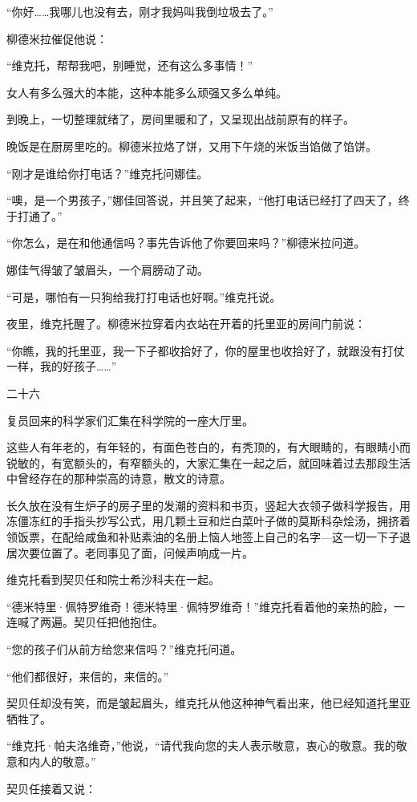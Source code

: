“你好……我哪儿也没有去，刚才我妈叫我倒垃圾去了。”

柳德米拉催促他说：

“维克托，帮帮我吧，别睡觉，还有这么多事情！”

女人有多么强大的本能，这种本能多么顽强又多么单纯。

到晚上，一切整理就绪了，房间里暖和了，又呈现出战前原有的样子。

晚饭是在厨房里吃的。柳德米拉烙了饼，又用下午烧的米饭当馅做了馅饼。

“刚才是谁给你打电话？”维克托问娜佳。

“噢，是一个男孩子，”娜佳回答说，并且笑了起来，“他打电话已经打了四天了，终于打通了。”

“你怎么，是在和他通信吗？事先告诉他了你要回来吗？”柳德米拉问道。

娜佳气得皱了皱眉头，一个肩膀动了动。

“可是，哪怕有一只狗给我打打电话也好啊。”维克托说。

夜里，维克托醒了。柳德米拉穿着内衣站在开着的托里亚的房间门前说：

“你瞧，我的托里亚，我一下子都收拾好了，你的屋里也收拾好了，就跟没有打仗一样，我的好孩子……”

二十六

复员回来的科学家们汇集在科学院的一座大厅里。

这些人有年老的，有年轻的，有面色苍白的，有秃顶的，有大眼睛的，有眼睛小而锐敏的，有宽额头的，有窄额头的，大家汇集在一起之后，就回味着过去那段生活中曾经存在的那种崇高的诗意，散文的诗意。

长久放在没有生炉子的房子里的发潮的资料和书页，竖起大衣领子做科学报告，用冻僵冻红的手指头抄写公式，用几颗土豆和烂白菜叶子做的莫斯科杂烩汤，拥挤着领饭票，在配给咸鱼和补贴素油的名册上恼人地签上自己的名字—这一切一下子退居次要位置了。老同事见了面，问候声响成一片。

维克托看到契贝任和院士希沙科夫在一起。

“德米特里·佩特罗维奇！德米特里·佩特罗维奇！”维克托看着他的亲热的脸，一连喊了两遍。契贝任把他抱住。

“您的孩子们从前方给您来信吗？”维克托问道。

“他们都很好，来信的，来信的。”

契贝任却没有笑，而是皱起眉头，维克托从他这种神气看出来，他已经知道托里亚牺牲了。

“维克托·帕夫洛维奇，”他说，“请代我向您的夫人表示敬意，衷心的敬意。我的敬意和内人的敬意。”

契贝任接着又说：

